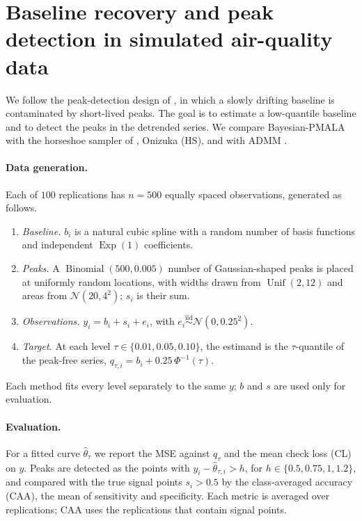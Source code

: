 \clearpage
\section{Baseline recovery and peak detection in simulated air-quality data}
\label{sec:air_simulation}

We follow the peak-detection design of \citet[Section~4.2]{brantley2020baseline}, in which a slowly drifting baseline is contaminated by short-lived peaks. The goal is to estimate a low-quantile baseline and to detect the peaks in the detrended series. We compare Bayesian-PMALA with the horseshoe sampler of \citet{onizuka2024fast}, Onizuka (HS), and with ADMM \citep{brantley2020baseline}.

\paragraph{Data generation.} Each of $100$ replications has $n=500$ equally spaced observations, generated as follows.
\begin{enumerate}
 \item \emph{Baseline.} $b_i$ is a natural cubic spline with a random number of basis functions and independent $\operatorname{Exp}(1)$ coefficients.
 \item \emph{Peaks.} A $\operatorname{Binomial}(500,0.005)$ number of Gaussian-shaped peaks is placed at uniformly random locations, with widths drawn from $\operatorname{Unif}(2,12)$ and areas from $\mathcal{N}(20,4^2)$; $s_i$ is their sum.
 \item \emph{Observations.} $y_i=b_i+s_i+e_i$, with $e_i\stackrel{\mathrm{iid}}{\sim}\mathcal{N}(0,0.25^2)$.
 \item \emph{Target.} At each level $\tau\in\{0.01,0.05,0.10\}$, the estimand is the $\tau$-quantile of the peak-free series, $q_{\tau,i}=b_i+0.25\,\Phi^{-1}(\tau)$.
\end{enumerate}
Each method fits every level separately to the same $y$; $b$ and $s$ are used only for evaluation.

\paragraph{Evaluation.} For a fitted curve $\widehat\theta_\tau$ we report the MSE against $q_\tau$ and the mean check loss (CL) on $y$. Peaks are detected as the points with $y_i-\widehat\theta_{\tau,i}>h$, for $h\in\{0.5,0.75,1,1.2\}$, and compared with the true signal points $s_i>0.5$ by the class-averaged accuracy (CAA), the mean of sensitivity and specificity. Each metric is averaged over replications; CAA uses the replications that contain signal points.

